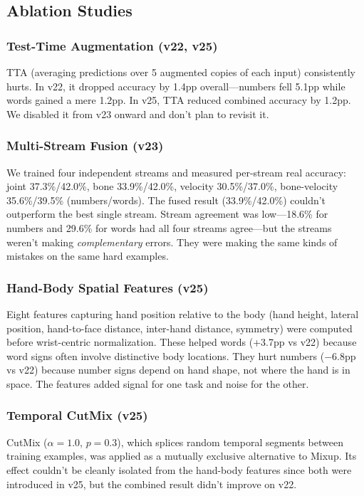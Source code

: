 \documentclass[conference]{IEEEtran}
\begin{document}
\subsection{Ablation Studies}

\subsubsection{Test-Time Augmentation (v22, v25)}
TTA (averaging predictions over 5 augmented copies of each input) consistently hurts. In v22, it dropped accuracy by 1.4pp overall---numbers fell 5.1pp while words gained a mere 1.2pp. In v25, TTA reduced combined accuracy by 1.2pp. We disabled it from v23 onward and don't plan to revisit it.

\subsubsection{Multi-Stream Fusion (v23)}
We trained four independent streams and measured per-stream real accuracy: joint 37.3\%/42.0\%, bone 33.9\%/42.0\%, velocity 30.5\%/37.0\%, bone-velocity 35.6\%/39.5\% (numbers/words). The fused result (33.9\%/42.0\%) couldn't outperform the best single stream. Stream agreement was low---18.6\% for numbers and 29.6\% for words had all four streams agree---but the streams weren't making \textit{complementary} errors. They were making the same kinds of mistakes on the same hard examples.

\subsubsection{Hand-Body Spatial Features (v25)}
Eight features capturing hand position relative to the body (hand height, lateral position, hand-to-face distance, inter-hand distance, symmetry) were computed before wrist-centric normalization. These helped words (+3.7pp vs v22) because word signs often involve distinctive body locations. They hurt numbers ($-$6.8pp vs v22) because number signs depend on hand shape, not where the hand is in space. The features added signal for one task and noise for the other.

\subsubsection{Temporal CutMix (v25)}
CutMix ($\alpha=1.0$, $p=0.3$), which splices random temporal segments between training examples, was applied as a mutually exclusive alternative to Mixup. Its effect couldn't be cleanly isolated from the hand-body features since both were introduced in v25, but the combined result didn't improve on v22.
\end{document}
